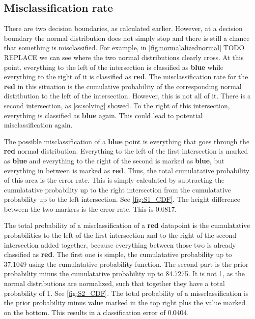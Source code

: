 \documentclass[10pt,a4paper]{article}
\begin{document}
\subsection{Misclassification rate}
There are two decision boundaries, as calculated earlier. However, at a decision boundary the normal distribution does not simply stop and there is still a chance that something is misclassified. For example, in \autoref{fig:normalalizednormal} TODO REPLACE we can see where the two normal distributions clearly cross. At this point, everything to the left of the intersection is classified as \textbf{blue} while everything to the right of it is classified as \textbf{red}. The misclassification rate for the \textbf{red} in this situation is the cumulative probability of the corresponding normal distribution to the left of the intersection. However, this is not all of it. There is a second intersection, as \autoref{ss:solving} showed. To the right of this intersection, everything is classified as \textbf{blue} again. This could lead to potential misclassification again. 

The possible misclassification of a \textbf{blue} point is everything that goes through the \textbf{red} normal distribution. Everything to the left of the first intersection is marked as \textbf{blue} and everything to the right of the second is marked as \textbf{blue}, but everything in between is marked as \textbf{red}. Thus, the total cumulatative probability of this area is the error rate. This is simply calculated by subtracting the cumulatative probability up to the right intersection from the cumulatative probability up to the left intersection. See \autoref{fig:S1_CDF}. The height difference between the two markers is the error rate. This is 0.0817.

The total probability of a misclassification of a \textbf{red} datapoint is the cumulatative probabilities to the left of the first intersection and to the right of the second intersection added together, because everything between those two is already classified as \textbf{red}.
The first one is simple, the cumulatative probability up to 37.1049 using the cumulatative probability function. The second part is the prior probability minus the cumulatative probability up to 84.7275. It is not 1, as the normal distributions are normalized, such that together they have a total probability of 1.
See \autoref{fig:S2_CDF}. The total probability of a missclassification is the prior probability minus value marked in the top right plus the value marked on the bottom. This results in a classification error of 0.0404.
\end{document}
